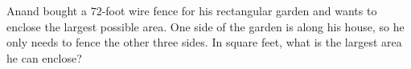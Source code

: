 Anand bought a $72$-foot wire fence for his rectangular garden and wants to enclose the largest possible area. One side of the garden is along his house, so he only needs to fence the other three sides. In square feet, what is the largest area he can enclose?
